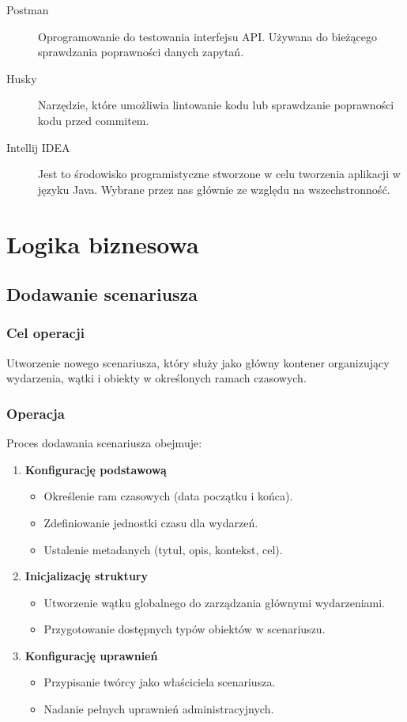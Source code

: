 \begin{description}
    \item[Postman] Oprogramowanie do testowania interfejsu API. Używana do bieżącego sprawdzania poprawności danych zapytań.
    \item[Husky] Narzędzie, które umożliwia lintowanie kodu lub sprawdzanie poprawności kodu przed commitem.
    \item[Intellij IDEA] Jest to środowisko programistyczne stworzone w celu tworzenia aplikacji w języku Java. Wybrane przez nas głównie ze względu na wszechstronność.
\end{description}

\section{Logika biznesowa}

\subsection{Dodawanie scenariusza}

\subsubsection{Cel operacji}
Utworzenie nowego scenariusza, który służy jako główny kontener organizujący wydarzenia, wątki i obiekty w określonych ramach czasowych.

\subsubsection{Operacja}
Proces dodawania scenariusza obejmuje:
\begin{enumerate}
    \item \textbf{Konfigurację podstawową}
    \begin{itemize}
        \item Określenie ram czasowych (data początku i końca).
        \item Zdefiniowanie jednostki czasu dla wydarzeń.
        \item Ustalenie metadanych (tytuł, opis, kontekst, cel).
    \end{itemize}
    \item \textbf{Inicjalizację struktury}
    \begin{itemize}
        \item Utworzenie wątku globalnego do zarządzania głównymi wydarzeniami.
        \item Przygotowanie dostępnych typów obiektów w scenariuszu.
    \end{itemize}
    \item \textbf{Konfigurację uprawnień}
    \begin{itemize}
        \item Przypisanie twórcy jako właściciela scenariusza.
        \item Nadanie pełnych uprawnień administracyjnych.
    \end{itemize}
\end{enumerate}

